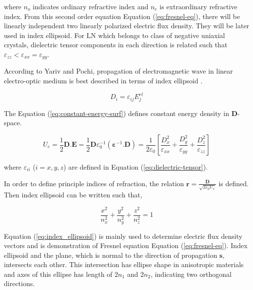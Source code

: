 \documentclass[thesis]{deutez}
\begin{document}
    where $n_o$ indicates ordinary refractive index and $n_e$ is extraordinary refractive index. From this second order equation Equation (\ref{eq:fresnel-eq}), there will be linearly independent two linearly polarized electric flux density. They will be later used in index ellipsoid. For LN which belongs to class of negative uniaxial crystals, dielectric tensor components in each direction is related such that $\varepsilon_{zz} < \varepsilon_{xx}=\varepsilon_{yy}$. 

     
    According to Yariv and Pochi, propagation of electromagnetic wave in linear electro-optic medium is best described in terms of index ellipsoid \cite{2}. 

    \begin{equation}
        D_i = \varepsilon_{ij}E_j^{el}
        \label{eq:flux-den}
    \end{equation}

    The Equation (\ref{eq:constant-energy-surf}) defines constant energy density in $\mathbf{D}$-space. 
    
    \begin{equation}
        U_e = \frac{1}{2}\mathbf{D}.\mathbf{E} = \frac{1}{2} \mathbf{D} \varepsilon_0^{-1}(\bm\varepsilon^{-1}.\mathbf{D}) = \frac{1}{2\varepsilon_0} \left[ \frac{D_x^2}{\varepsilon_{xx}} + \frac{D_y^2}{\varepsilon_{yy}} + \frac{D_z^2}{\varepsilon_{zz}} \right]
        \label{eq:constant-energy-surf} 
    \end{equation}

    where $\varepsilon_{ii}$ ($i=x,y,z$) are defined in Equation (\ref{eq:dielectric-tensor}). 

    In order to define principle indices of refraction, the relation $\mathbf{r}=\frac{\mathbf{D}}{\sqrt{2\varepsilon_0U_e}}$ is defined. Then index ellipsoid can be written such that,

    \begin{equation}
        \frac{x^2}{n_x^2}+\frac{y^2}{n_y^2}+\frac{z^2}{n_z^2}=1
        \label{eq:index_ellipsoid}
    \end{equation}


    Equation (\ref{eq:index_ellipsoid}) is mainly used to determine electric flux density vectors and is demonstration of Fresnel equation Equation (\ref{eq:fresnel-eq}). Index ellipsoid and the plane, which is normal to the direction of propagation $\mathbf{s}$, intersects each other. This intersection has ellipse shape in anisotropic materials and axes of this ellipse has length of $2n_1$ and $2n_2$, indicating two orthogonal directions. 
\end{document}
